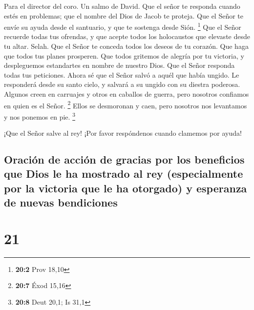 Para el director del coro. Un salmo de David.  Que el señor
te responda cuando estés en problemas; que el nombre del Dios de Jacob
te proteja.  Que el Señor te envíe su ayuda desde el
santuario, y que te sostenga desde Sión. \footnote{\textbf{20:2} Prov
  18,10}  Que el Señor recuerde todas tus ofrendas, y que
acepte todos los holocaustos que elevaste desde tu altar. Selah.
 Que el Señor te conceda todos los deseos de tu corazón. Que
haga que todos tus planes prosperen.  Que todos gritemos de
alegría por tu victoria, y despleguemos estandartes en nombre de nuestro
Dios. Que el Señor responda todas tus peticiones.  Ahora sé
que el Señor salvó a aquél que había ungido. Le responderá desde su
santo cielo, y salvará a su ungido con su diestra poderosa. 
Algunos creen en carruajes y otros en caballos de guerra, pero nosotros
confiamos en quien es el Señor. \footnote{\textbf{20:7} Éxod 15,16}
 Ellos se desmoronan y caen, pero nosotros nos levantamos y
nos ponemos en pie. \footnote{\textbf{20:8} Deut 20,1; Is 31,1}

 ¡Que el Señor salve al rey! ¡Por favor respóndenos cuando
clamemos por ayuda!

\hypertarget{oraciuxf3n-de-acciuxf3n-de-gracias-por-los-beneficios-que-dios-le-ha-mostrado-al-rey-especialmente-por-la-victoria-que-le-ha-otorgado-y-esperanza-de-nuevas-bendiciones}{%
\subsection{Oración de acción de gracias por los beneficios que Dios le
ha mostrado al rey (especialmente por la victoria que le ha otorgado) y
esperanza de nuevas
bendiciones}\label{oraciuxf3n-de-acciuxf3n-de-gracias-por-los-beneficios-que-dios-le-ha-mostrado-al-rey-especialmente-por-la-victoria-que-le-ha-otorgado-y-esperanza-de-nuevas-bendiciones}}

\hypertarget{section-20}{%
\section{21}\label{section-20}}

